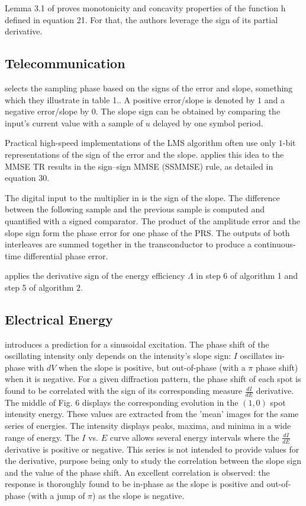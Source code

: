\documentclass[11pt]{book}
\begin{document}
Lemma 3.1 of \cite{bonettini2021variable} proves monotonicity and
concavity properties of the function h defined in equation 21. For
that, the authors leverage the sign of its partial derivative.


\subsection{Telecommunication}

\cite{musa2003clock} selects the sampling phase based on the signs
of the error and slope, something which they illustrate in table 1..
A positive error/slope is denoted by $1$ and a negative error/slope
by $0$. The slope sign can be obtained by comparing the input's current
value with a sample of $u$ delayed by one symbol period.

Practical high-speed implementations of the LMS algorithm often use
only $1$-bit representations of the sign of the error and the slope.
\cite{musa2007modeling} applies this idea to the MMSE TR results
in the sign--sign MMSE (SSMMSE) rule, as detailed in equation 30.

The digital input to the multiplier in \cite{edwards200912} is the
sign of the slope. The difference between the following sample and
the previous sample is computed and quantified with a signed comparator.
The product of the amplitude error and the slope sign form the phase
error for one phase of the PRS. The outputs of both interleaves are
summed together in the transconductor to produce a continuous-time
differential phase error.

\cite{dong2018energy} applies the derivative sign of the energy efficiency
$\Lambda$ in step 6 of algorithm 1 and step 5 of algorithm 2.


\subsection{Electrical Energy}

\cite{pesty2005low} introduces a prediction for a sinusoidal excitation.
The phase shift of the oscillating intensity only depends on the intensity's
slope sign: $I$ oscillates in-phase with $dV$ when the slope is
positive, but out-of-phase (with a $\pi$ phase shift) when it is
negative. For a given diffraction pattern, the phase shift of each
spot is found to be correlated with the sign of its corresponding
measure $\frac{dI}{dE}$ derivative. The middle of Fig. 6 displays
the corresponding evolution in the $\left(1,0\right)$ spot intensity
energy. These values are extracted from the 'mean' images for the
same series of energies. The intensity displays peaks, maxima, and
minima in a wide range of energy. The $I$ vs. $E$ curve allows several
energy intervals where the $\frac{dI}{dE}$ derivative is positive
or negative. This series is not intended to provide values for the
derivative, purpose being only to study the correlation between the
slope sign and the value of the phase shift. An excellent correlation
is observed: the response is thoroughly found to be in-phase as the
slope is positive and out-of-phase (with a jump of $\pi$) as the
slope is negative.
\end{document}
